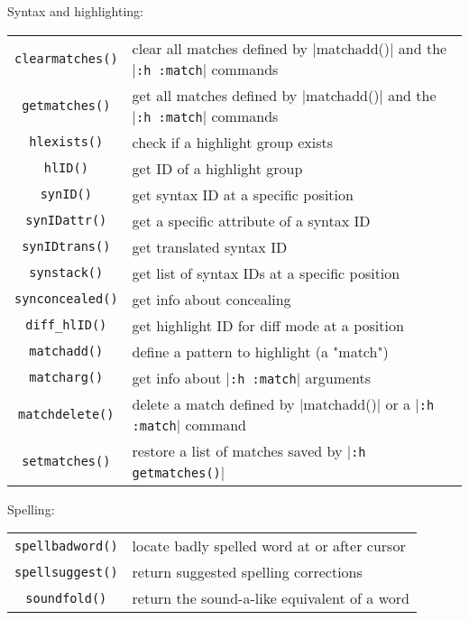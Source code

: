 Syntax and highlighting:
\label{syntax-functions}
\label{highlighting-functions}
\begin{center} \begin{tabular}{c l}
				\verb!clearmatches()! & clear all matches defined by |matchadd()| and the |\verb!:h :match!| commands \\
				\verb!getmatches()! & get all matches defined by |matchadd()| and the |\verb!:h :match!| commands \\
				\verb!hlexists()! & check if a highlight group exists \\
				\verb!hlID()! & get ID of a highlight group \\
				\verb!synID()! & get syntax ID at a specific position \\
				\verb!synIDattr()! & get a specific attribute of a syntax ID \\
				\verb!synIDtrans()! & get translated syntax ID \\
				\verb!synstack()! & get list of syntax IDs at a specific position \\
				\verb!synconcealed()! & get info about concealing \\
				\verb!diff_hlID()! & get highlight ID for diff mode at a position \\
				\verb!matchadd()! & define a pattern to highlight (a "match") \\
				\verb!matcharg()! & get info about |\verb!:h :match!| arguments \\
				\verb!matchdelete()! & delete a match defined by |matchadd()| or a |\verb!:h :match!| command \\
				\verb!setmatches()! & restore a list of matches saved by |\verb!:h getmatches()!| \\
\end{tabular} \end{center}

Spelling:
\label{spell-functions}
\begin{center} \begin{tabular}{c l}
				\verb!spellbadword()! & locate badly spelled word at or after cursor \\
				\verb!spellsuggest()! & return suggested spelling corrections \\
				\verb!soundfold()! & return the sound-a-like equivalent of a word \\
\end{tabular} \end{center}

